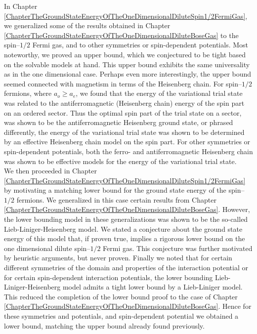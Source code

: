 In Chapter \ref{ChapterTheGroundStateEnergyOfTheOneDimensionalDiluteSpin1/2FermiGas}, we generalized some of the results obtained in Chapter \ref{ChapterTheGroundStateEnergyOfTheOneDimensionalDiluteBoseGas} to the spin--$ 1/2 $ Fermi gas, and to other symmetries or spin-dependent potentials. Most noteworthy, we proved an upper bound, which we conjectured to be tight based on the solvable models at hand. This upper bound exhibits the same universality as in the one dimensional case. Perhaps even more interestingly, the upper bound seemed connected with magnetism in terms of the Heisenberg chain. For spin--$ 1/2 $ fermions, where $ a_o\geq a_e $, we found that the energy of the variational trial state was related to the antiferromagnetic (Heisenberg chain) energy of the spin part on an ordered sector. Thus the optimal spin part of the trial state on a sector, was shown to be the antiferromagnetic Heisenberg ground state, or phrased differently, the energy of the variational trial state was shown to be determined by an effective Heisenberg chain model on the spin part. For other symmetries or spin-dependent potentials, both the ferro- and antiferromagnetic Heisenberg chain was shown to be effective models for the energy of the variational trial state.\\
We then proceeded in Chapter \ref{ChapterTheGroundStateEnergyOfTheOneDimensionalDiluteSpin1/2FermiGas} by motivating a matching lower bound for the ground state energy of the spin--$ 1/2 $ fermions. We generalized in this case certain results from Chapter \ref{ChapterTheGroundStateEnergyOfTheOneDimensionalDiluteBoseGas}. However, the lower bounding model in these generalizations was shown to be the so-called Lieb-Liniger-Heisenberg model. We stated a conjecture about the ground state energy of this model that, if proven true, implies a rigorous lower bound on the one dimensional dilute spin--$ 1/2 $ Fermi gas. This conjecture was further motivated by heuristic arguments, but never proven. Finally we noted that for certain different symmetries of the domain and properties of the interaction potential or for certain spin-dependent  interaction potentials, the lower bounding Lieb-Liniger-Heisenberg model admits a tight lower bound by a Lieb-Liniger model. This reduced the completion of the lower bound proof to the case of Chapter \ref{ChapterTheGroundStateEnergyOfTheOneDimensionalDiluteBoseGas}. Hence for these symmetries and potentials, and spin-dependent potential we obtained a lower bound, matching the upper bound already found previously.

